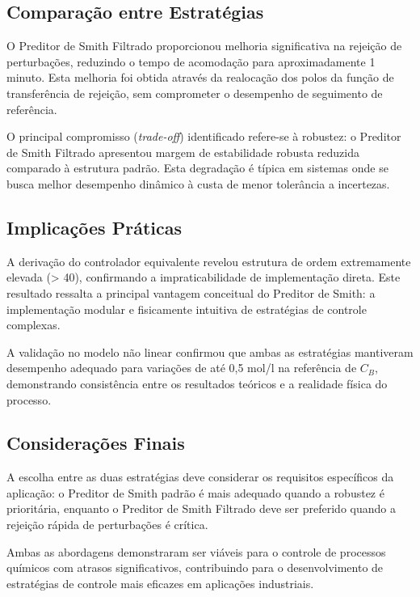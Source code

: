 \documentclass[a4paper,12pt]{article}
\begin{document}
\subsection{Comparação entre Estratégias}

O Preditor de Smith Filtrado proporcionou melhoria significativa na rejeição de perturbações, reduzindo o tempo de acomodação para aproximadamente 1 minuto. Esta melhoria foi obtida através da realocação dos polos da função de transferência de rejeição, sem comprometer o desempenho de seguimento de referência.

O principal compromisso (\textit{trade-off}) identificado refere-se à robustez: o Preditor de Smith Filtrado apresentou margem de estabilidade robusta reduzida comparado à estrutura padrão. Esta degradação é típica em sistemas onde se busca melhor desempenho dinâmico à custa de menor tolerância a incertezas.

\subsection{Implicações Práticas}

A derivação do controlador equivalente revelou estrutura de ordem extremamente elevada (> 40), confirmando a impraticabilidade de implementação direta. Este resultado ressalta a principal vantagem conceitual do Preditor de Smith: a implementação modular e fisicamente intuitiva de estratégias de controle complexas.

A validação no modelo não linear confirmou que ambas as estratégias mantiveram desempenho adequado para variações de até 0,5 mol/l na referência de $C_B$, demonstrando consistência entre os resultados teóricos e a realidade física do processo.

\subsection{Considerações Finais}

A escolha entre as duas estratégias deve considerar os requisitos específicos da aplicação: o Preditor de Smith padrão é mais adequado quando a robustez é prioritária, enquanto o Preditor de Smith Filtrado deve ser preferido quando a rejeição rápida de perturbações é crítica.

Ambas as abordagens demonstraram ser viáveis para o controle de processos químicos com atrasos significativos, contribuindo para o desenvolvimento de estratégias de controle mais eficazes em aplicações industriais.
\end{document}
